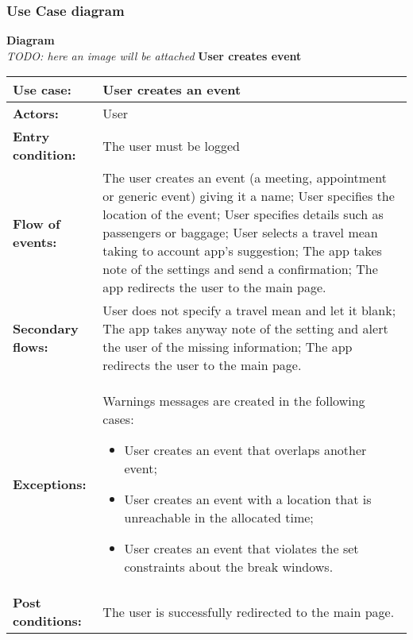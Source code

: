 	\subsubsection{Use Case diagram}
		\textbf{Diagram} \\
		\indent \textit{TODO: here an image will be attached}
		\newline
		\textbf{User creates event}
		\renewcommand{\arraystretch}{1.6} %
			\begin{table}[h!]
			\begin{tabu} to \textwidth {| X[\fcWidth,r,p] | X[1-\fcWidth,l,p] |}
				\hline\textbf{Use case:} & User creates an event
				\\
				\hline\textbf{Actors:} & User
				\\
				\hline\textbf{Entry condition:} & The user must be logged
				\\
				\hline\textbf{Flow of events:} & The user creates an event (a meeting, appointment or generic event) giving it a name;\newline
				User specifies the location of the event;\newline
				User specifies details such as passengers or baggage;\newline
				User selects a travel mean taking to account app’s suggestion;\newline
				The app takes note of the settings and send a confirmation;\newline
				The app redirects the user to the main page.
				\\
				\hline\textbf{Secondary flows:} & User does not specify a travel mean and let it blank;\newline
				The app takes anyway note of the setting and alert the user of the missing information; \newline
				The app redirects the user to the main page.
				\\
				\hline\textbf{Exceptions:} & Warnings messages are created in the following cases:
				\begin{itemize}
					\item User creates an event that overlaps another event;
					\item User creates an event with a location that is unreachable in the allocated time;
					\item User creates an event that violates the set constraints about the break windows.
				\end{itemize}
				\\
				\hline\textbf{Post conditions:} & The user is successfully redirected to the main page.
				\\
				\hline
			\end{tabu}
			\end{table}
